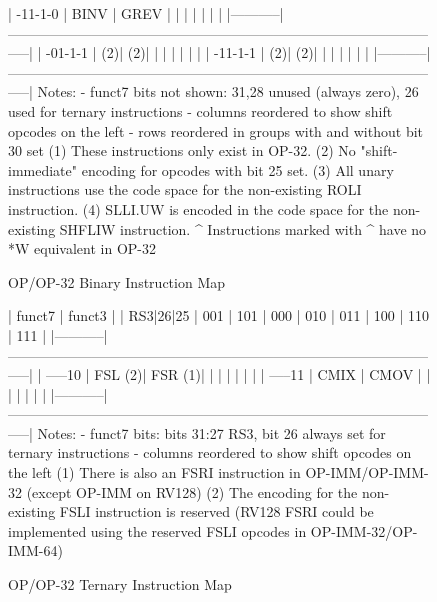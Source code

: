 \begin{figure}[t]
\begin{center}
\begin{minipage}{\linewidth}
\begin{verbnobox}[\tiny]
|  -11-1-0  |    BINV   |    GREV   |           |           |           |           |           |           |
|-----------|-----------------------------------------------------------------------------------------------|
|  -01-1-1  |        (2)|        (2)|           |           |           |           |           |           |
|  -11-1-1  |        (2)|        (2)|           |           |           |           |           |           |
|-----------|-----------------------------------------------------------------------------------------------|
Notes:
- funct7 bits not shown: 31,28 unused (always zero), 26 used for ternary instructions
- columns reordered to show shift opcodes on the left
- rows reordered in groups with and without bit 30 set
(1) These instructions only exist in OP-32.
(2) No "shift-immediate" encoding for opcodes with bit 25 set.
(3) All unary instructions use the code space for the non-existing ROLI instruction.
(4) SLLI.UW is encoded in the code space for the non-existing SHFLIW instruction.
^ Instructions marked with ^ have no *W equivalent in OP-32
\end{verbnobox}
\end{minipage}
\end{center}
\caption{OP/OP-32 Binary Instruction Map}
\label{op-op32-bin}
\end{figure}

\begin{figure}[t]
\begin{center}
\begin{minipage}{\linewidth}
\begin{verbnobox}[\tiny]
|   funct7  |                                             funct3                                            |
| RS3|26|25 |    001    |    101    |    000    |    010    |    011    |    100    |    110    |    111    |
|-----------|-----------------------------------------------------------------------------------------------|
|  -----10  |    FSL (2)|    FSR (1)|           |           |           |           |           |           |
|  -----11  |    CMIX   |    CMOV   |           |           |           |           |           |           |
|-----------|-----------------------------------------------------------------------------------------------|
Notes:
- funct7 bits: bits 31:27 RS3, bit 26 always set for ternary instructions
- columns reordered to show shift opcodes on the left
(1) There is also an FSRI instruction in OP-IMM/OP-IMM-32 (except OP-IMM on RV128)
(2) The encoding for the non-existing FSLI instruction is reserved
(RV128 FSRI could be implemented using the reserved FSLI opcodes in OP-IMM-32/OP-IMM-64)
\end{verbnobox}
\end{minipage}
\end{center}
\caption{OP/OP-32 Ternary Instruction Map}
\label{op-op32-tern}
\end{figure}

